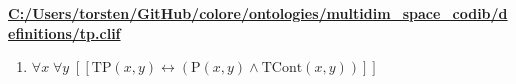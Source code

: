 \documentclass{article}
\begin{document}
\textbf{\url{C:/Users/torsten/GitHub/colore/ontologies/multidim\_space\_codib/definitions/tp.clif}}

\begin{enumerate}
\item $\forall x\; \forall y\;  \left[ \left[ \textrm{TP}(x,y) \leftrightarrow \left(\textrm{P}(x,y) \land \textrm{TCont}(x,y)\right) \right] \right]$
\end{enumerate}
\end{document}
